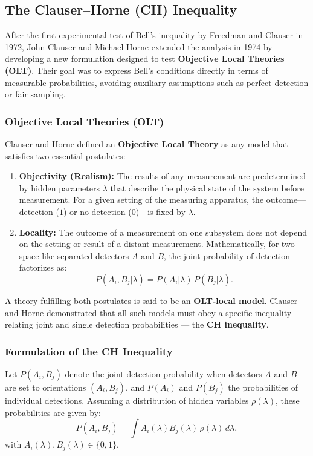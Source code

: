 \subsection{The Clauser–Horne (CH) Inequality}

After the first experimental test of Bell’s inequality by Freedman and Clauser in 1972,  
John Clauser and Michael Horne extended the analysis in 1974 by developing a new formulation designed to test \textbf{Objective Local Theories (OLT)}.  
Their goal was to express Bell’s conditions directly in terms of measurable probabilities, avoiding auxiliary assumptions such as perfect detection or fair sampling.

\subsubsection{Objective Local Theories (OLT)}

Clauser and Horne defined an \textbf{Objective Local Theory} as any model that satisfies two essential postulates:

\begin{enumerate}
    \item \textbf{Objectivity (Realism):}  
    The results of any measurement are predetermined by hidden parameters $\lambda$ that describe the physical state of the system before measurement.  
    For a given setting of the measuring apparatus, the outcome—detection ($1$) or no detection ($0$)—is fixed by $\lambda$.

    \item \textbf{Locality:}  
    The outcome of a measurement on one subsystem does not depend on the setting or result of a distant measurement.  
    Mathematically, for two space-like separated detectors $A$ and $B$, the joint probability of detection factorizes as:
    \[
    P(A_i,B_j|\lambda) = P(A_i|\lambda) \, P(B_j|\lambda).
    \]
\end{enumerate}

A theory fulfilling both postulates is said to be an \textbf{OLT-local model}.  
Clauser and Horne demonstrated that all such models must obey a specific inequality relating joint and single detection probabilities — the \textbf{CH inequality}.

\subsubsection{Formulation of the CH Inequality}

Let $P(A_i,B_j)$ denote the joint detection probability when detectors $A$ and $B$ are set to orientations $(A_i,B_j)$,  
and $P(A_i)$ and $P(B_j)$ the probabilities of individual detections.  
Assuming a distribution of hidden variables $\rho(\lambda)$, these probabilities are given by:
\[
P(A_i,B_j) = \int A_i(\lambda) B_j(\lambda) \, \rho(\lambda)\, d\lambda,
\]
with $A_i(\lambda),B_j(\lambda)\in\{0,1\}$.

